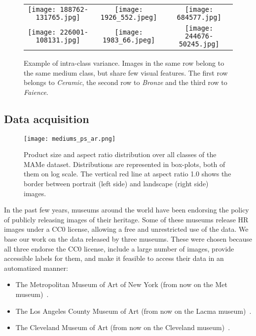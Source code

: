 \documentclass{article}
\begin{document}
\begin{figure}[tb]
    \centering
    \begin{tabular}{ccc}
        \texttt{[image: 188762-131765.jpg]} &
        \texttt{[image: 1926\_552.jpeg]} &
        \texttt{[image: 684577.jpg]} \\
        \texttt{[image: 226001-108131.jpg]} &
        \texttt{[image: 1983\_66.jpeg]} &
        \texttt{[image: 244676-50245.jpg]}\\
    \end{tabular}
    \caption{Example of intra-class variance. Images in the same row belong to the same medium class, but share few visual features. The first row belongs to \textit{Ceramic}, the second row to \textit{Bronze} and the third row to \textit{Faience}.}
    \label{fig:intra-class_variance}
\end{figure}


\subsection{Data acquisition}

\begin{figure}[tb]
\centering
\texttt{[image: mediums\_ps\_ar.png]}
\caption{Product size and aspect ratio distribution over all classes of the MAMe dataset. Distributions are represented in box-plots, both of them on log scale. The vertical red line at aspect ratio 1.0 shows the border between portrait (left side) and landscape (right side) images.}
\label{fig:class_ps_ar_distr}
\end{figure}

In the past few years, museums around the world have been endorsing the policy of publicly releasing images of their heritage. Some of these museums release HR images under a CC0 license, allowing a free and unrestricted use of the data. We base our work on the data released by three museums. These were chosen because all three endorse the CC0 license, include a large number of images, provide accessible labels for them, and make it feasible to access their data in an automatized manner:
\begin{itemize}
    \item The Metropolitan Museum of Art of New York (from now on the Met museum)~\citep{Metrelease}.\item The Los Angeles County Museum of Art (from now on the Lacma museum)~\citep{Lacmarelease}.\item The Cleveland Museum of Art (from now on the Cleveland museum)~\citep{Clevelandrelease}.\end{itemize}
\end{document}
